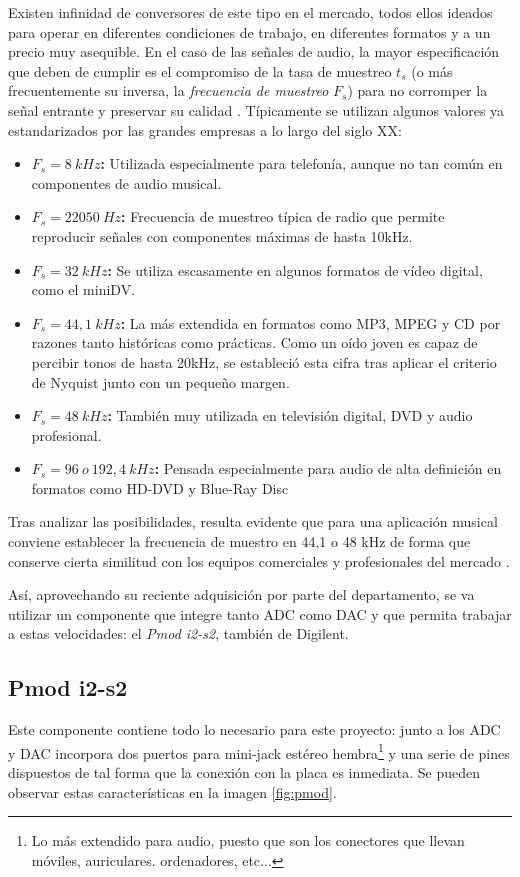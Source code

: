 Existen infinidad de conversores de este tipo en el mercado, todos ellos ideados para operar en diferentes condiciones de trabajo, en diferentes formatos y a un precio muy asequible. En el caso de las señales de audio, la mayor especificación que deben de cumplir es el compromiso de la tasa de muestreo $t_{s}$ (o más frecuentemente su inversa, la \emph{frecuencia de muestreo} $F_{s}$) para no corromper la señal entrante y preservar su calidad \cite{samplerate}. Típicamente se utilizan algunos valores ya estandarizados por las grandes empresas a lo largo del siglo XX:

\begin{itemize}
\item \textbf{$F_{s} = 8~kHz$:} Utilizada especialmente para telefonía, aunque no tan común en componentes de audio musical.
\item \textbf{$F_{s} = 22050~Hz$:} Frecuencia de muestreo típica de radio que permite reproducir señales con componentes máximas de hasta 10kHz.
\item \textbf{$F_{s} = 32~kHz$:} Se utiliza escasamente en algunos formatos de vídeo digital, como el miniDV.
\item \textbf{$F_{s} = 44,1~kHz$:} La más extendida en formatos como MP3, MPEG y CD por razones tanto históricas como prácticas. Como un oído joven es capaz de percibir tonos de hasta 20kHz, se estableció esta cifra tras aplicar el criterio de Nyquist junto con un pequeño margen.
\item \textbf{$F_{s} = 48~kHz$:} También muy utilizada en televisión digital, DVD y audio profesional.
\item \textbf{$F_{s} = 96~o~192,4~kHz$:} Pensada especialmente para audio de alta definición en formatos como HD-DVD y Blue-Ray Disc
\end{itemize}

Tras analizar las posibilidades, resulta evidente que para una aplicación musical conviene establecer la frecuencia de muestro en 44,1 o 48 kHz de forma que conserve cierta similitud con los equipos comerciales y profesionales del mercado \cite{cdsamp}.

Así, aprovechando su reciente adquisición por parte del departamento, se va utilizar un componente que integre tanto ADC como DAC y que permita trabajar a estas velocidades: el \emph{Pmod i2-s2}, también de Digilent.

\subsection{Pmod i2-s2}
Este componente contiene todo lo necesario para este proyecto: junto a los ADC y DAC incorpora dos puertos para mini-jack estéreo hembra\footnote{Lo más extendido para audio, puesto que son los conectores que llevan móviles, auriculares. ordenadores, etc...} y una serie de pines dispuestos de tal forma que la conexión con la placa es inmediata. Se pueden observar estas características en la imagen \ref{fig:pmod}.

